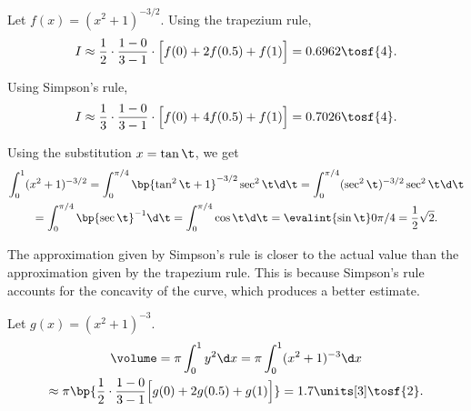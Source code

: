 \begin{solution}
    \begin{ppart}
        Let $f(x) = (x^2 + 1)^{-3/2}$. Using the trapezium rule, \[I \approx \frac12 \cdot \frac{1 - 0}{3 -1} \cdot \Big[f(0) + 2f(0.5) + f(1)\Big] = 0.6962 \tosf{4}.\]

        Using Simpson's rule, \[I \approx \frac13 \cdot \frac{1 - 0}{3 -1} \cdot \Big[f(0) + 4f(0.5) + f(1)\Big] = 0.7026 \tosf{4}.\]
    \end{ppart}
    \begin{ppart}
        Using the substitution $x = \tan \t$, we get
        \begin{gather*}
            \int_0^1 (x^2 + 1)^{-3/2} = \int_0^{\pi/4} \bp{\tan^2 \t + 1}^{-3/2} \sec^2 \t \d \t 
            = \int_0^{\pi/4} (\sec^2 \t)^{-3/2} \sec^2 \t \d \t\\
            = \int_0^{\pi/4} \bp{\sec \t}^{-1} \d \t = \int_0^{\pi/4} \cos \t \d \t = \evalint{\sin \t}0{\pi/4} = \frac12 \sqrt2.
        \end{gather*}

        The approximation given by Simpson's rule is closer to the actual value than the approximation given by the trapezium rule. This is because Simpson's rule accounts for the concavity of the curve, which produces a better estimate.
    \end{ppart}
    \begin{ppart}
        Let $g(x) = (x^2 + 1)^{-3}$.
        \begin{gather*}
            \volume = \pi \int_0^1 y^2 \d x = \pi \int_0^1 (x^2 + 1)^{-3} \d x\\
            \approx \pi \bp{\frac12 \cdot \frac{1- 0}{3 - 1}  \Big[g(0) + 2g(0.5) + g(1)\Big]} = 1.7 \units[3] \tosf{2}.
        \end{gather*}
    \end{ppart}
\end{solution}

